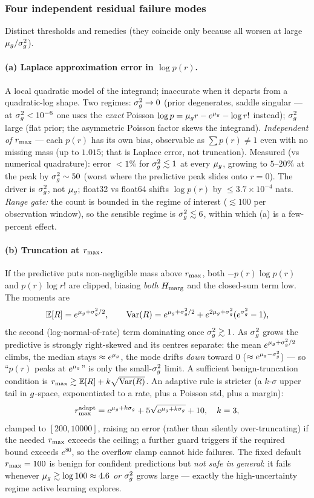 \subsubsection{Four independent residual failure modes}
Distinct thresholds and remedies (they coincide only because all worsen at large
$\mu_{g}/\sigma_{g}^{2}$).

\paragraph{(a) Laplace approximation error in $\log p(r)$.} A local quadratic
model of the integrand; inaccurate when it departs from a quadratic-log shape.
Two regimes: $\sigma_{g}^{2}\to0$ (prior degenerates, saddle singular --- at $\sigma_{g}^{2}<10^{-6}$
one uses the \emph{exact} Poisson $\log p=\mu_{g} r-e^{\mu_{g}}-\log r!$ instead);
$\sigma_{g}^{2}$ large (flat prior; the asymmetric Poisson factor skews the integrand).
\emph{Independent of $r_{\max}$} --- each $p(r)$ has its own bias, observable as
$\sum p(r)\neq1$ even with no missing mass (up to $1.015$; that is Laplace error,
not truncation). Measured (vs numerical quadrature): error $<1\%$ for $\sigma_{g}^{2}\lesssim1$
at every $\mu_{g}$, growing to $5$--$20\%$ at the peak by $\sigma_{g}^{2}\sim50$ (worst where
the predictive peak slides onto $r=0$). The driver is $\sigma_{g}^{2}$, not $\mu_{g}$; float32
vs float64 shifts $\log p(r)$ by $\le3.7\times10^{-4}$ nats. \emph{Range gate:}
the count is bounded in the regime of interest ($\lesssim100$ per observation
window), so the sensible regime is $\sigma_{g}^{2}\lesssim6$, within which (a) is a
few-percent effect.

\paragraph{(b) Truncation at $r_{\max}$.} If the predictive puts non-negligible mass
above $r_{\max}$, both $-p(r)\log p(r)$ and $p(r)\log r!$ are clipped, biasing
\emph{both} $H_{\mathrm{marg}}$ and the closed-sum term low. The moments are
\[
  \mathbb{E}[R]=e^{\mu_{g}+\sigma_{g}^{2}/2},\qquad
  \mathrm{Var}(R)=e^{\mu_{g}+\sigma_{g}^{2}/2}+e^{2\mu_{g}+\sigma_{g}^{2}}(e^{\sigma_{g}^{2}}-1),
\]
the second (log-normal-of-rate) term dominating once $\sigma_{g}^{2}\gtrsim1$. As $\sigma_{g}^{2}$
grows the predictive is strongly right-skewed and its centres separate: the mean
$e^{\mu_{g}+\sigma_{g}^{2}/2}$ climbs, the median stays $\approx e^{\mu_{g}}$, the mode drifts
\emph{down} toward $0$ ($\approx e^{\mu_{g}-\sigma_{g}^{2}}$) --- so ``$p(r)$ peaks at
$e^{\mu_{g}}$'' is only the small-$\sigma_{g}^{2}$ limit. A sufficient benign-truncation
condition is $r_{\max}\gtrsim\mathbb{E}[R]+k\sqrt{\mathrm{Var}(R)}$. An adaptive rule is
stricter (a $k$-$\sigma$ upper tail in $g$-space, exponentiated to a rate, plus
a Poisson std, plus a margin):
\[
  r_{\max}^{\mathrm{adapt}}=e^{\mu_{g}+k\sigma_g}+5\sqrt{e^{\mu_{g}+k\sigma_g}}+10,\quad k=3,
\]
clamped to $[200,10000]$, raising an error (rather than silently over-truncating)
if the needed $r_{\max}$ exceeds the ceiling; a further guard triggers if the
required bound exceeds $e^{80}$, so the overflow clamp cannot hide failures. The
fixed default $r_{\max}=100$ is benign for confident predictions but \emph{not safe
in general}: it fails whenever $\mu_{g}\gtrsim\log100\approx4.6$ \emph{or} $\sigma_{g}^{2}$
grows large --- exactly the high-uncertainty regime active learning explores.

